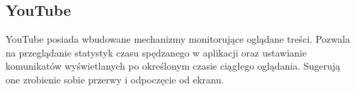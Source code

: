 \bigskip
{}

\subsection{YouTube}
YouTube posiada wbudowane mechanizmy monitorujące oglądane treści. Pozwala na przeglądanie statystyk czasu spędzanego w aplikacji oraz ustawianie komunikatów wyświetlanych po określonym czasie ciągłego oglądania. Sugerują one zrobienie sobie przerwy i odpoczęcie od ekranu.

\bigskip
{}
